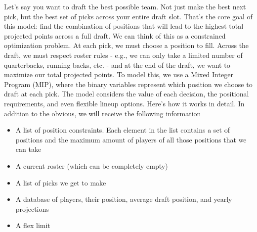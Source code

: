 \documentclass{article}
\begin{document}
Let's say you want to draft the best possible team. Not just make the best next pick, but the best set of picks across your entire draft slot. That's the core goal of this model: find the combination of positions that will lead to the highest total projected points across a full draft.
We can think of this as a constrained optimization problem. At each pick, we must choose a position to fill. Across the draft, we must respect roster rules - e.g., we can only take a limited number of quarterbacks, running backs, etc. - and at the end of the draft, we want to maximize our total projected points.
To model this, we use a Mixed Integer Program (MIP), where the binary variables represent which position we choose to draft at each pick. The model considers the value of each decision, the positional requirements, and even flexible lineup options. Here's how it works in detail.
In addition to the obvious, we will receive the following information
\begin{itemize}
  \item A list of position constraints.  Each element in the list contains a set of positions and the maximum amount of players of all those positions that we can take
  \item A current roster (which can be completely empty)
  \item A list of picks we get to make
  \item A database of players, their position, average draft position, and yearly projections
  \item A flex limit
\end{itemize}
\end{document}
